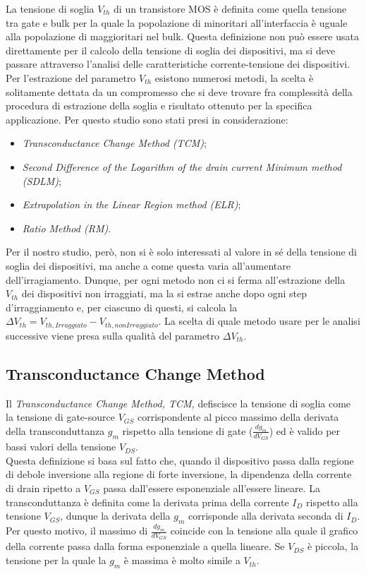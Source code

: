 La tensione di soglia $V_{th}$ di un transistore MOS è definita come quella tensione tra gate e bulk per la quale la popolazione di minoritari all'interfaccia è uguale alla popolazione di maggioritari nel bulk. Questa definizione non può essere usata direttamente per il calcolo della tensione di soglia dei dispositivi, ma si deve passare attraverso l'analisi delle caratteristiche corrente-tensione dei dispositivi. \\
Per l'estrazione del parametro $V_{th}$ esistono numerosi metodi\cite{art2}, la scelta è solitamente dettata da un compromesso che si deve trovare fra complessità della procedura di estrazione della soglia e risultato ottenuto per la specifica applicazione. Per questo studio sono stati presi in considerazione:

\begin{itemize}
  \item \emph{Transconductance Change Method (TCM)};
  \item \emph{Second Difference of the Logarithm of the drain current Minimum method (SDLM)};
  \item \emph{Extrapolation in the Linear Region method (ELR)};
  \item \emph{Ratio Method (RM)}.
\end{itemize}

Per il nostro studio, però, non si è solo interessati al valore in sé della tensione di soglia dei dispositivi, ma anche a come questa varia all'aumentare dell'irragiamento. Dunque, per ogni metodo non ci si ferma all'estrazione della $V_{th}$ dei dispositivi non irraggiati, ma la si estrae anche dopo ogni step d'irraggiamento e, per ciascuno di questi, si calcola la $\Delta V_{th} = V_{th, Irraggiato}-V_{th, non Irraggiato}$. La scelta di quale metodo usare per le analisi successive viene presa sulla qualità del parametro $\Delta V_{th}$.

\subsection[TCM]{Transconductance Change Method}
Il \emph{Transconductance Change Method, TCM,} defiscisce la tensione di soglia come la tensione di gate-source $V_{GS}$ corrispondente al picco massimo della derivata della transconduttanza $g_m$ rispetto alla tensione di gate ($\frac{dg_m}{dV_ {GS}}$) ed è valido per bassi valori della tensione $V_{DS}$.\\
Questa definizione si basa sul fatto che, quando il dispositivo passa dalla regione di debole inversione alla regione di forte inversione, la dipendenza della corrente di drain ripetto a $V_{GS}$ passa dall'essere esponenziale all'essere lineare.
La transconduttanza è definita come la derivata prima della corrente $I_D$ rispetto alla tensione $V_{GS}$, dunque la derivata della $g_m$ corrisponde alla derivata seconda di $I_D$. Per questo motivo, il massimo di $\frac{dg_m}{dV_{GS}}$ coincide con la tensione alla quale il grafico della corrente passa dalla forma esponenziale a quella lineare. Se $V_{DS}$ è piccola, la tensione per la quale la $g_m$ è massima è molto simile a $V_{th}$.

